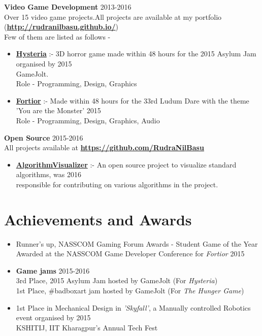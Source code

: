 \documentclass[margin, centered]{res}
\begin{document}
\begin{resume}

\textbf{Video Game Development} \hfill 2013-2016\\
Over 15 video game projects.All projects are available at my portfolio (\href{http://rudranilbasu.github.io/}{\textbf{http://rudranilbasu.github.io/}})\\
Few of them are listed as follows - 

\begin{itemize}[leftmargin=*]
	\item \textbf{\href{http://gamejolt.com/games/hysteria/107191}{Hysteria}} :- 3D horror game made within 48 hours for the 2015 Asylum Jam organised by \hfill 2015 \\GameJolt. \\Role - Programming, Design, Graphics
	\item \textbf{\href{http://gamejolt.com/games/fortior/88093}{Fortior}} :- Made within 48 hours for the 33rd Ludum Dare with the theme 'You are the Monster' \hfill 2015
	\\Role - Programming, Design, Graphics, Audio
\end{itemize}


\textbf{Open Source} \hfill 2015-2016\\
All projects available at \textbf{\href{https://github.com/RudraNilBasu}{https://github.com/RudraNilBasu}}
\begin{itemize}[leftmargin=*]
	\item \textbf{\href{https://github.com/parkjs814/AlgorithmVisualizer}{AlgorithmVisualizer}} :- An open source project to visualize standard algorithms, was \hfill 2016 \\
responsible for contributing on various algorithms in the project.

	
\end{itemize}

\section{Achievements and Awards}
\begin{itemize}[leftmargin=*]
\item Runner's up, NASSCOM Gaming Forum Awards - Student Game of the Year\\ 
Awarded at the NASSCOM Game Developer Conference for \textit{Fortior} \hfill 2015
\item \textbf{Game jams} \hfill 2015-2016
\\
3rd Place, 2015 Asylum Jam hosted by GameJolt (For \textit{Hysteria})\\
1st Place, \#badboxart jam hosted by GameJolt (For \textit{The Hunger Game})
\item 1st Place in Mechanical Design in \textit{'Skyfall'}, a Manually controlled Robotics event organised by \hfill2015 \\ KSHITIJ, IIT Kharagpur's Annual Tech Fest
\end{itemize}


\end{resume}
\end{document}
